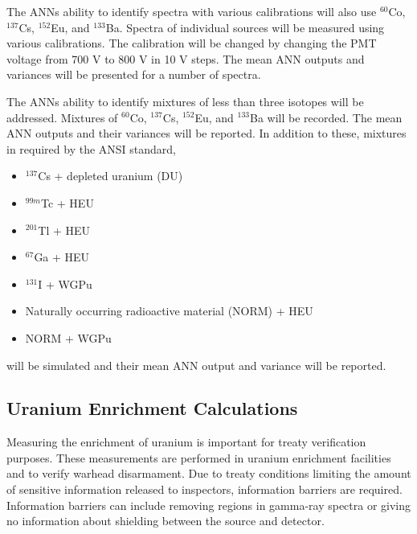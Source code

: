 \documentclass[tocnosub,noragright,centerchapter,12pt,fullpage]{uiucecethesis09}
\begin{document}
The ANNs ability to identify spectra with various calibrations will also use $^{60}$Co, $^{137}$Cs, $^{152}$Eu, and $^{133}$Ba. Spectra of individual sources will be measured using various calibrations. The calibration will be changed by changing the PMT voltage from 700 V to 800 V in 10 V steps. The mean ANN outputs and variances will be presented for a number of spectra. 

The ANNs ability to identify mixtures of less than three isotopes will be addressed. Mixtures of $^{60}$Co, $^{137}$Cs, $^{152}$Eu, and $^{133}$Ba will be recorded. The mean ANN outputs and their variances will be reported. In addition to these, mixtures in required by the ANSI standard, 

\begin{itemize}
  \item $^{137}$Cs + depleted uranium (DU)
  \item $^{99m}$Tc + HEU
  \item $^{201}$Tl + HEU
  \item $^{67}$Ga + HEU
  \item $^{131}$I + WGPu
  \item Naturally occurring radioactive material (NORM) + HEU
  \item NORM + WGPu
\end{itemize}

will be simulated and their mean ANN output and variance will be reported. 




\subsection{Uranium Enrichment Calculations}

Measuring the enrichment of uranium is important for treaty verification purposes. These measurements are performed in uranium enrichment facilities and to verify warhead disarmament. Due to treaty conditions limiting the amount of sensitive information released to inspectors, information barriers are required. Information barriers can include removing regions in gamma-ray spectra or giving no information about shielding between the source and detector. 
\end{document}
